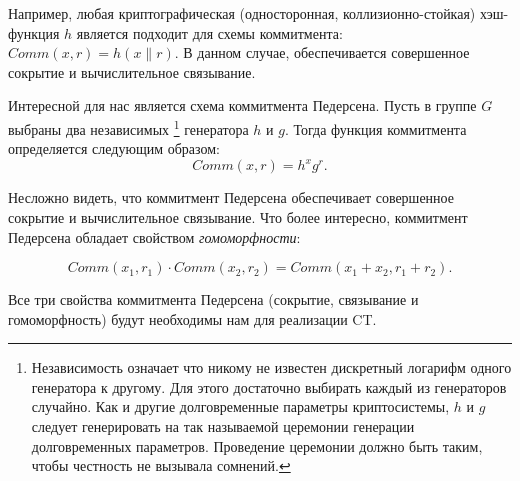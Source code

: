 \documentclass{article}
\begin{document}
Например, любая криптографическая (односторонная, коллизионно-стойкая) хэш-функция $h$ является подходит
для схемы коммитмента: $Comm(x, r) = h(x \parallel r)$. В данном случае,
обеспечивается совершенное сокрытие и вычислительное связывание.

Интересной для нас является схема коммитмента Педерсена.
Пусть в группе $G$ выбраны два независимых
\footnote{Независимость означает что никому не известен дискретный логарифм одного генератора к другому.
Для этого достаточно выбирать каждый из генераторов случайно.
Как и другие долговременные параметры криптосистемы,
$h$ и $g$ следует генерировать на так называемой церемонии генерации долговременных параметров.
Проведение церемонии должно быть таким, чтобы честность не вызывала сомнений.}
 генератора $h$ и $g$. Тогда функция коммитмента определяется следующим образом:
 $$
 Comm(x, r) = h^x g^r.
 $$

 Несложно видеть, что коммитмент Педерсена обеспечивает совершенное сокрытие и вычислительное связывание.
 Что более интересно, коммитмент Педерсена обладает свойством \textit{гомоморфности}:

 $$
 Comm(x_1, r_1) \cdot Comm(x_2, r_2) = Comm(x_1 + x_2, r_1 + r_2).
 $$

Все три свойства коммитмента Педерсена (сокрытие, связывание и гомоморфность)
будут необходимы нам для реализации CT.

% 
% 
\end{document}
